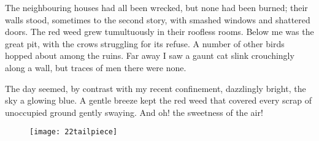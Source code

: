 The neighbouring houses had all been wrecked, but none had been burned; their walls stood, sometimes to the second story, with smashed windows and shattered doors. The red weed grew tumultuously in their roofless rooms. Below me was the great pit, with the crows struggling for its refuse. A number of other birds hopped about among the ruins. Far away I saw a gaunt cat slink crouchingly along a wall, but traces of men there were none.



The day seemed, by contrast with my recent confinement, dazzlingly bright, the sky a glowing blue. A gentle breeze kept the red weed that covered every scrap of unoccupied ground gently swaying. And oh! the sweetness of the air!

\begin{figure}[bh!]
\centering
\texttt{[image: 22tailpiece]}
\end{figure}
\enlargethispage{2\baselineskip}